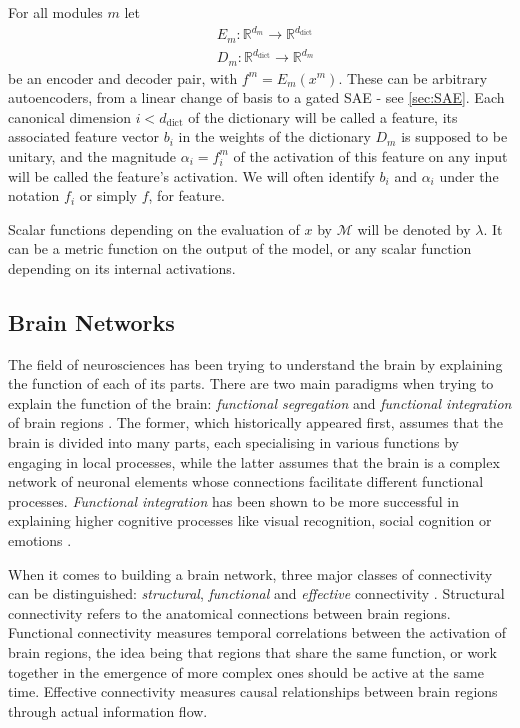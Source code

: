 \documentclass{article}
\newcommand{\R}{\mathbb{R}}
\begin{document}
For all modules $m$ let
\begin{align*}
&E_m : \R^{d_{m}} \rightarrow \R^{d_{\mathrm{dict}}}\\
&D_m : \R^{d_{\mathrm{dict}}} \rightarrow \R^{d_{m}}
\end{align*}
be an encoder and decoder pair, with $f^m = E_m(x^m)$. These can be arbitrary autoencoders, from a linear change of basis to a gated SAE - see \cref{sec:SAE}. Each canonical dimension $i < d_{\mathrm{dict}}$ of the dictionary will be called a feature, its associated feature vector $b_i$ in the weights of the dictionary $D_m$ is supposed to be unitary, and the magnitude $\alpha_i = f^m_i$ of the activation of this feature on any input will be called the feature's activation. We will often identify $b_i$ and $\alpha_i$ under the notation $f_i$ or simply $f$, for feature.

Scalar functions depending on the evaluation of $x$ by $\mathcal{M}$ will be denoted by $\lambda$. It can be a metric function on the output of the model, or any scalar function depending on its internal activations.

\subsection{Brain Networks}
\label{sec:brain_networks}

The field of neurosciences has been trying to understand the brain by explaining the function of each of its parts. There are two main paradigms when trying to explain the function of the brain: \textit{functional segregation} and \textit{functional integration} of brain regions \citep{tononi1994measure, sporns2013network, pavlovic2015generalised}. The former, which historically appeared first, assumes that the brain is divided into many parts, each specialising in various functions by engaging in local processes, while the latter assumes that the brain is a complex network of neuronal elements whose connections facilitate different functional processes. \textit{Functional integration} has been shown to be more successful in explaining higher cognitive processes like visual recognition, social cognition or emotions \citep{van2013network}.

When it comes to building a brain network, three major classes of connectivity can be distinguished: \textit{structural}, \textit{functional} and \textit{effective} connectivity \citep{hagmann2007mapping, friston2011functional}. Structural connectivity refers to the anatomical connections between brain regions. Functional connectivity measures temporal correlations between the activation of brain regions, the idea being that regions that share the same function, or work together in the emergence of more complex ones should be active at the same time. Effective connectivity measures causal relationships between brain regions through actual information flow.
\end{document}
